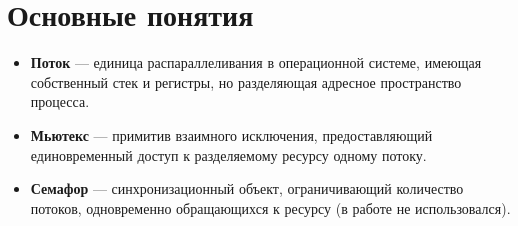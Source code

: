 \section*{Основные понятия}
\begin{itemize}
        \item \textbf{Поток} --- единица распараллеливания в операционной системе, имеющая собственный стек и регистры, но разделяющая адресное пространство процесса.
        \item \textbf{Мьютекс} --- примитив взаимного исключения, предоставляющий единовременный доступ к разделяемому ресурсу одному потоку.
        \item \textbf{Семафор} --- синхронизационный объект, ограничивающий количество потоков, одновременно обращающихся к ресурсу (в работе не использовался).
\end{itemize}

\clearpage
